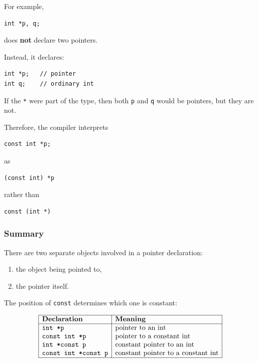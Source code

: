 \documentclass[10pt]{article}
\begin{document}
For example,

\begin{verbatim}
int *p, q;
\end{verbatim}

does \textbf{not} declare two pointers.

Instead, it declares:

\begin{verbatim}
int *p;   // pointer
int q;    // ordinary int
\end{verbatim}

If the \verb|*| were part of the type, then both \verb|p| and \verb|q| would be pointers, but they are not.

Therefore, the compiler interprets

\begin{verbatim}
const int *p;
\end{verbatim}

as

\begin{verbatim}
(const int) *p
\end{verbatim}

rather than

\begin{verbatim}
const (int *)
\end{verbatim}

\subsubsection*{Summary}

There are two separate objects involved in a pointer declaration:

\begin{enumerate}
    \item the object being pointed to,
    \item the pointer itself.
\end{enumerate}

The position of \verb|const| determines which one is constant:

\[
\begin{array}{|l|l|}
\hline
\textbf{Declaration} & \textbf{Meaning} \\
\hline
\verb|int *p| & \text{pointer to an int} \\
\verb|const int *p| & \text{pointer to a constant int} \\
\verb|int *const p| & \text{constant pointer to an int} \\
\verb|const int *const p| & \text{constant pointer to a constant int} \\
\hline
\end{array}
\]
\end{document}
